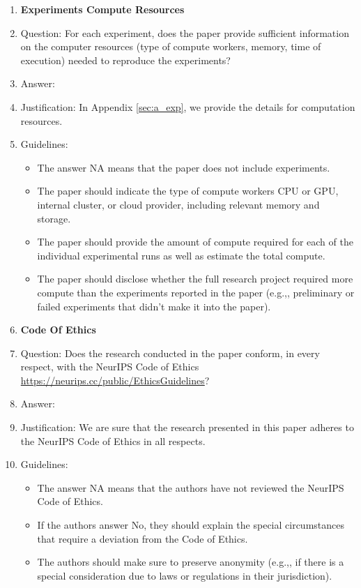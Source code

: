 \documentclass{article}
\theoremstyle{plain}
\theoremstyle{definition}
\theoremstyle{remark}
\begin{document}
\begin{enumerate}
\item {\bf Experiments Compute Resources}
    \item[] Question: For each experiment, does the paper provide sufficient information on the computer resources (type of compute workers, memory, time of execution) needed to reproduce the experiments?
    \item[] Answer: \answerYes{} %
    \item[] Justification: In Appendix \ref{sec:a_exp}, we provide the details for computation resources.
    \item[] Guidelines:
    \begin{itemize}
        \item The answer NA means that the paper does not include experiments.
        \item The paper should indicate the type of compute workers CPU or GPU, internal cluster, or cloud provider, including relevant memory and storage.
        \item The paper should provide the amount of compute required for each of the individual experimental runs as well as estimate the total compute. 
        \item The paper should disclose whether the full research project required more compute than the experiments reported in the paper (e.g.,, preliminary or failed experiments that didn't make it into the paper). 
    \end{itemize}
    
\item {\bf Code Of Ethics}
    \item[] Question: Does the research conducted in the paper conform, in every respect, with the NeurIPS Code of Ethics \url{https://neurips.cc/public/EthicsGuidelines}?
    \item[] Answer: \answerYes{} %
    \item[] Justification: We are sure that the research presented in this paper adheres to the NeurIPS Code of Ethics in all respects.
    \item[] Guidelines:
    \begin{itemize}
        \item The answer NA means that the authors have not reviewed the NeurIPS Code of Ethics.
        \item If the authors answer No, they should explain the special circumstances that require a deviation from the Code of Ethics.
        \item The authors should make sure to preserve anonymity (e.g.,, if there is a special consideration due to laws or regulations in their jurisdiction).
    \end{itemize}



\end{enumerate}
\end{document}

